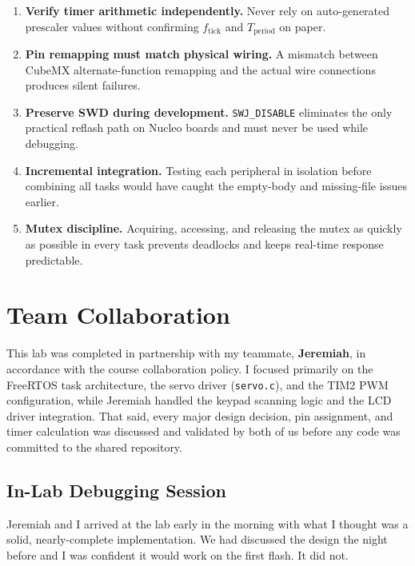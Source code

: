 \documentclass[11pt, a4paper]{article}
\begin{document}
\begin{enumerate}[noitemsep, topsep=2pt]
  \item \textbf{Verify timer arithmetic independently.} Never rely on auto-generated
        prescaler values without confirming $f_\text{tick}$ and $T_\text{period}$ on paper.
  \item \textbf{Pin remapping must match physical wiring.} A mismatch between CubeMX
        alternate-function remapping and the actual wire connections produces silent failures.
  \item \textbf{Preserve SWD during development.} \texttt{SWJ\_DISABLE} eliminates the
        only practical reflash path on Nucleo boards and must never be used while debugging.
  \item \textbf{Incremental integration.} Testing each peripheral in isolation before
        combining all tasks would have caught the empty-body and missing-file issues earlier.
  \item \textbf{Mutex discipline.} Acquiring, accessing, and releasing the mutex as quickly
        as possible in every task prevents deadlocks and keeps real-time response predictable.
\end{enumerate}

\section{Team Collaboration}

This lab was completed in partnership with my teammate, \textbf{Jeremiah}, in accordance
with the course collaboration policy. I focused primarily on the FreeRTOS task architecture,
the servo driver (\texttt{servo.c}), and the TIM2 PWM configuration, while Jeremiah handled
the keypad scanning logic and the LCD driver integration. That said, every major design
decision, pin assignment, and timer calculation was discussed and validated by both of us
before any code was committed to the shared repository.

\subsection{In-Lab Debugging Session}

Jeremiah and I arrived at the lab early in the morning with what I thought was a solid,
nearly-complete implementation. We had discussed the design the night before and I was
confident it would work on the first flash. It did not.
\end{document}
